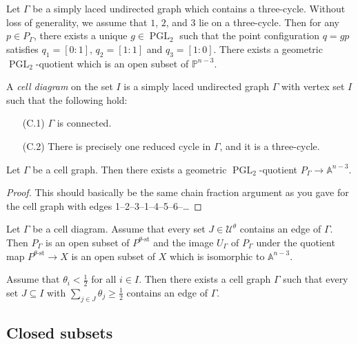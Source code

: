 \documentclass[11pt, a4paper]{amsart}
\begin{document}
\begin{rem}
	Let \(\Gamma\) be a simply laced undirected graph which contains a three-cycle. 
	Without loss of generality, we assume that \(1\), \(2\), and \(3\) lie on a three-cycle. 
	Then for any \(p \in P_\Gamma\), there exists a unique \(g \in \operatorname{PGL}_2\) such that the point configuration \(q = gp\) satisfies \(q_1 = [0:1]\), \(q_2 = [1:1]\) and \(q_3 = [1:0]\). 
	There exists a geometric \(\operatorname{PGL}_2\)-quotient which is an open subset of \(\mathbb{P}^{n-3}\).
\end{rem}

\begin{defn}
	A \emph{cell diagram} on the set \(I\) is a simply laced undirected graph \(\Gamma\) with vertex set \(I\) such that the following hold:
	\begin{enumerate}
		\item[(C.1)] \(\Gamma\) is connected.
		\item[(C.2)] There is precisely one reduced cycle in \(\Gamma\), and it is a three-cycle. 
	\end{enumerate}
\end{defn}

\begin{lem}
	Let \(\Gamma\) be a cell graph. 
	Then there exists a geometric \(\operatorname{PGL}_2\)-quotient \(P_{\Gamma} \to \mathbb{A}^{n-3}\).
\end{lem}

\begin{proof}
	This should basically be the same chain fraction argument as you gave for the cell graph with edges 1--2--3--1--4--5--6--\ldots
\end{proof}

Let \(\Gamma\) be a cell diagram. 
Assume that every set \(J \in \mathcal{U}^\theta\) contains an edge of \(\Gamma\). 
Then \(P_\Gamma\) is an open subset of \(P^{\theta\text{-st}}\) and the image \(U_\Gamma\) of \(P_\Gamma\) under the quotient map \(P^{\theta\text{-st}} \to X\) is an open subset of \(X\) which is isomorphic to \(\mathbb{A}^{n-3}\).

\begin{claim}
	Assume that \(\theta_i < \frac{1}{2}\) for all \(i \in I\). 
	Then there exists a cell graph \(\Gamma\) such that every set \(J \subseteq I\) with \(\sum_{j \in J} \theta_j \geq \frac{1}{2}\) contains an edge of \(\Gamma\).
\end{claim}

\subsection*{Closed subsets}
\end{document}
